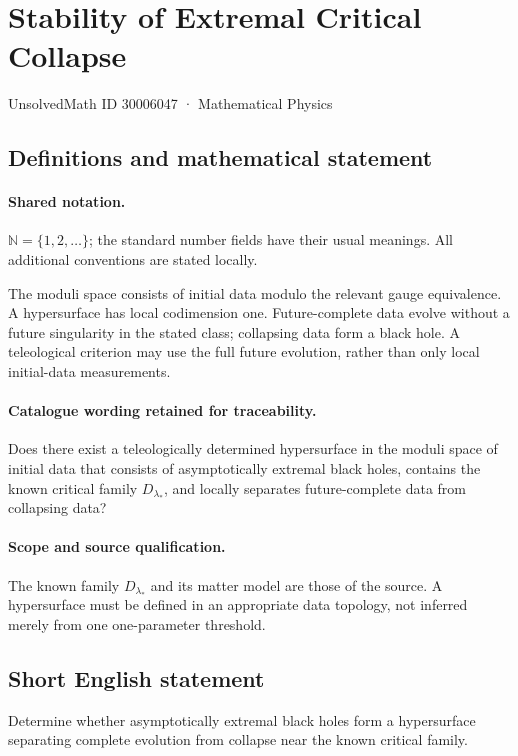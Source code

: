 \documentclass[11pt]{article}
\begin{document}
\setcounter{section}{30006046}
\section{Stability of Extremal Critical Collapse}\label{30006047}
{\small UnsolvedMath ID 30006047 · Mathematical Physics}
\subsection{Definitions and mathematical statement}

\paragraph{Shared notation.}$\mathbb N=\{1,2,\ldots\}$; the standard number fields have their usual meanings. All additional conventions are stated locally.


The moduli space consists of initial data modulo the relevant gauge equivalence. A hypersurface has local codimension one. Future-complete data evolve without a future singularity in the stated class; collapsing data form a black hole. A teleological criterion may use the full future evolution, rather than only local initial-data measurements.

\paragraph{Catalogue wording retained for traceability.}
Does there exist a teleologically determined hypersurface in the moduli space of initial data that consists of asymptotically extremal black holes, contains the known critical family $D_{\lambda_*}$, and locally separates future-complete data from collapsing data?

\paragraph{Scope and source qualification.}The known family $D_{\lambda_*}$ and its matter model are those of the source. A hypersurface must be defined in an appropriate data topology, not inferred merely from one one-parameter threshold.
\subsection{Short English statement}
Determine whether asymptotically extremal black holes form a hypersurface separating complete evolution from collapse near the known critical family.
\end{document}
